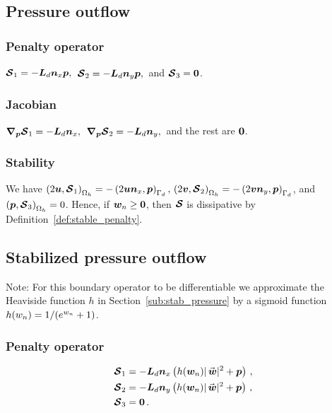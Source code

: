 \subsection{Pressure outflow}%
\label{sub:pressure_outflow}
\subsubsection*{Penalty operator}
$\bm{\mathcal{S}}_1 = -\bm{L}_d \bm{n}_x \bm{p},\,$
$\bm{\mathcal{S}}_2 = -\bm{L}_d \bm{n}_y \bm{p},\,$
and
$\bm{\mathcal{S}}_3 = \bm{0}$.

\subsubsection*{Jacobian}
  $\bm{\nabla}_{\bm{p}} \bm{\mathcal{S}}_1 = -\bm{L}_d \bm{n}_x,\,$
  $\bm{\nabla}_{\bm{p}} \bm{\mathcal{S}}_2 = -\bm{L}_d \bm{n}_y,\,$
  and the rest are $\bm{0}$.

\subsubsection*{Stability}
We have $\left(2\bm{u}, \bm{\mathcal{S}}_1\right)_{\Omega_h} = -\left(2\bm{u} \bm{n}_x, \bm{p}\right)_{\Gamma_d}, \, \left(2\bm{v}, \bm{\mathcal{S}}_2\right)_{\Omega_h} = -\left(2\bm{v} \bm{n}_y, \bm{p}\right)_{\Gamma_d}$, and $\left(\bm{p}, \bm{\mathcal{S}}_3\right)_{\Omega_h} = 0$. Hence, if $\bm{w}_n \geq \bm{0}$, then $\bm{\mathcal{S}}$ is dissipative by Definition~\ref{def:stable_penalty}.


\subsection{Stabilized pressure outflow}%
\label{sub:stabilized_pressure_outflow}
Note: For this boundary operator to be differentiable we approximate the Heaviside function $h$ in Section~\ref{sub:stab_pressure} by a sigmoid function $h(w_n) = 1/(e^{w_n} + 1)$.
\subsubsection*{Penalty operator}
  \begin{equation*}
    \begin{aligned}
      \satn_1 &= -\Lng \nnx \left(h(\wnn)|\wn|^2 + \pn\right) \,, \\
      \satn_2 &= -\Lng \nny \left(h(\wnn)|\wn|^2 + \pn\right) \,, \\
      \satn_3 &= \zeron\,.
    \end{aligned}
  \end{equation*}

